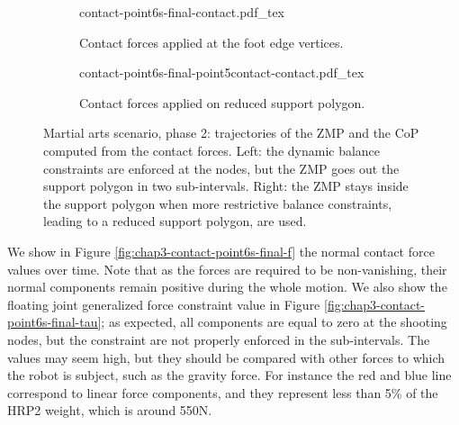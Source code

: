 \begin{figure}
  \centering
  \begin{subfigure}{0.49\linewidth}
    \centering
        {\def\svgwidth{\linewidth}
          {\tiny
            
                       {contact-point6s-final-contact.pdf_tex}
          }
        }
        \caption{Contact forces applied at the foot edge vertices.}
        \label{fig:chap3-contact-point6s-final-contact-edge}
  \end{subfigure}
  \begin{subfigure}{0.49\linewidth}
    \centering
        {\def\svgwidth{\linewidth}
          {\tiny
            
                       {contact-point6s-final-point5contact-contact.pdf_tex}
          }
        }
        \caption{Contact forces applied on reduced support polygon.}
        \label{fig:chap3-contact-point6s-final-contact-reduced}
  \end{subfigure}
  \caption{Martial arts scenario, phase 2: trajectories of the ZMP and
    the CoP computed from the contact forces. Left: the dynamic
    balance constraints are enforced at the nodes, but the ZMP goes
    out the support polygon in two sub-intervals. Right: the ZMP stays
    inside the support polygon when more restrictive balance
    constraints, leading to a reduced support polygon, are used.}
  \label{fig:chap3-contact-point6s-final-contact}
\end{figure}

We show in Figure \ref{fig:chap3-contact-point6s-final-f} the normal
contact force values over time. Note that as the forces are required
to be non-vanishing, their normal components remain positive during
the whole motion. We also show the floating joint generalized force
constraint value in Figure
\ref{fig:chap3-contact-point6s-final-tau}; as expected, all
components are equal to zero at the shooting nodes, but the constraint
are not properly enforced in the sub-intervals. The values may seem
high, but they should be compared with other forces to which the robot
is subject, such as the gravity force. For instance the red and blue
line correspond to linear force components, and they represent less
than 5\% of the HRP2 weight, which is around 550N.

